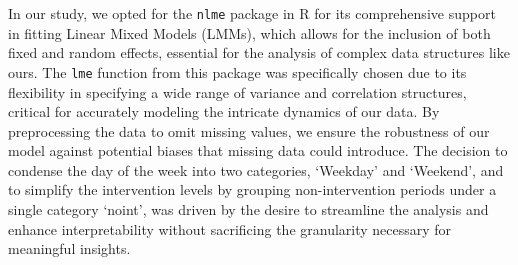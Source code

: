 \documentclass[
]{article}
\begin{document}
In our study, we opted for the \texttt{nlme} package in R for its comprehensive support in fitting Linear Mixed Models (LMMs), which allows for the inclusion of both fixed and random effects, essential for the analysis of complex data structures like ours. The \texttt{lme} function from this package was specifically chosen due to its flexibility in specifying a wide range of variance and correlation structures, critical for accurately modeling the intricate dynamics of our data. By preprocessing the data to omit missing values, we ensure the robustness of our model against potential biases that missing data could introduce. The decision to condense the day of the week into two categories, `Weekday' and `Weekend', and to simplify the intervention levels by grouping non-intervention periods under a single category `noint', was driven by the desire to streamline the analysis and enhance interpretability without sacrificing the granularity necessary for meaningful insights.
\end{document}
